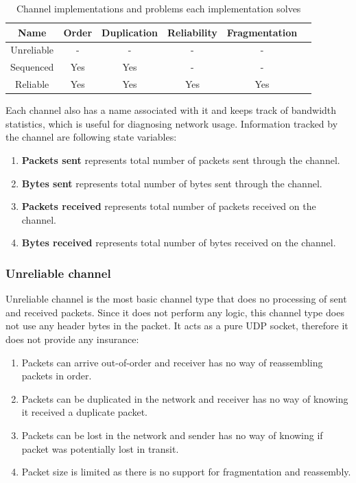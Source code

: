 \documentclass[times, utf8, diplomski]{fer}
\begin{document}
\begin{center}
	\begin{table}[H]
		\centering
		
		\begin{tabular}{ |c|c|c|c|c|c| } 
			\hline
			Name & Order & Duplication & Reliability & Fragmentation \\ 
			\hline
			Unreliable        & - & - & - & - \\ 
			Sequenced         & Yes & Yes & - & - \\ 
			Reliable          & Yes & Yes & Yes & Yes \\ 
			\hline
		\end{tabular}
		
		\caption{Channel implementations and problems each implementation solves}
	\end{table}
\end{center}

Each channel also has a name associated with it and keeps track of bandwidth statistics, which is useful for diagnosing network usage. Information tracked by the channel are following state variables:

\begin{enumerate}
	\item \textbf{Packets sent} represents total number of packets sent through the channel.
	\item \textbf{Bytes sent} represents total number of bytes sent through the channel.
	\item \textbf{Packets received} represents total number of packets received on the channel.
	\item \textbf{Bytes received} represents total number of bytes received on the channel.
\end{enumerate}



\subsubsection{Unreliable channel}
Unreliable channel is the most basic channel type that does no processing of sent and received packets. Since it does not perform any logic, this channel type does not use any header bytes in the packet. It acts as a pure UDP socket, therefore it does not provide any insurance:

\begin{enumerate}
	\item Packets can arrive out-of-order and receiver has no way of reassembling packets in order.
	\item Packets can be duplicated in the network and receiver has no way of knowing it received a duplicate packet.
	\item Packets can be lost in the network and sender has no way of knowing if packet was potentially lost in transit.
	\item Packet size is limited as there is no support for fragmentation and reassembly.
\end{enumerate}
\end{document}
